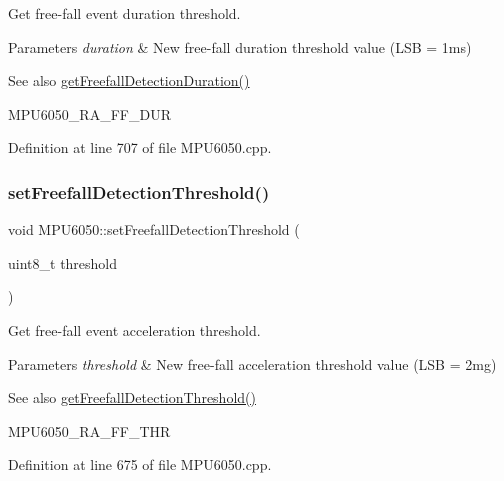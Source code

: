 Get free-\/fall event duration threshold. 


\begin{DoxyParams}{Parameters}
{\em duration} & New free-\/fall duration threshold value (L\+SB = 1ms) \\
\hline
\end{DoxyParams}
\begin{DoxySeeAlso}{See also}
\mbox{\hyperlink{classMPU6050_a3cff6b9613ad01aa1a51c287f5c5e329}{get\+Freefall\+Detection\+Duration()}} 

M\+P\+U6050\+\_\+\+R\+A\+\_\+\+F\+F\+\_\+\+D\+UR 
\end{DoxySeeAlso}


Definition at line 707 of file M\+P\+U6050.\+cpp.

\mbox{\label{classMPU6050_af704e1a4eb01522b146abeba78c32716}} 
\subsubsection{\texorpdfstring{setFreefallDetectionThreshold()}{setFreefallDetectionThreshold()}}
{\footnotesize\ttfamily void M\+P\+U6050\+::set\+Freefall\+Detection\+Threshold (\begin{DoxyParamCaption}\item[{uint8\+\_\+t}]{threshold }\end{DoxyParamCaption})}



Get free-\/fall event acceleration threshold. 


\begin{DoxyParams}{Parameters}
{\em threshold} & New free-\/fall acceleration threshold value (L\+SB = 2mg) \\
\hline
\end{DoxyParams}
\begin{DoxySeeAlso}{See also}
\mbox{\hyperlink{classMPU6050_ac7f5c0511fe9d0f3525a3757498daed7}{get\+Freefall\+Detection\+Threshold()}} 

M\+P\+U6050\+\_\+\+R\+A\+\_\+\+F\+F\+\_\+\+T\+HR 
\end{DoxySeeAlso}


Definition at line 675 of file M\+P\+U6050.\+cpp.

\mbox{\label{classMPU6050_a96aa409e02cdb7d3671890c70b44f167}} 
